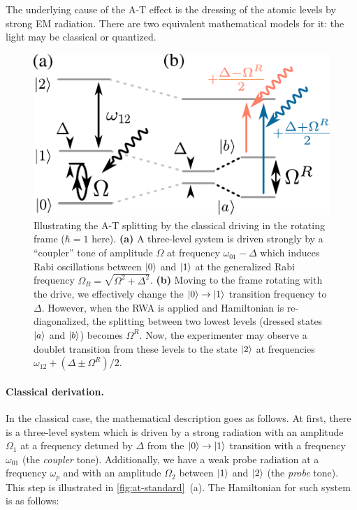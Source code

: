 \documentclass[%
 pra,
 amsmath,amssymb,
 reprint,%
]{revtex4-1}
\begin{document}
The underlying cause of the A-T effect is the dressing of the atomic levels by strong EM radiation. There are two equivalent mathematical models for it: the light may be classical or quantized.

\begin{figure}[b]	
	\includegraphics[width=\linewidth]{intro_scheme}
	\caption{Illustrating the A-T splitting by  the classical driving in the rotating frame ($\hbar=1$ here). \textbf{(a)} A three-level system is driven strongly by a ``coupler'' tone of amplitude $\Omega$ at frequency $\omega_{01}-\Delta$ which induces Rabi oscillations between $\ket{0}$ and $\ket{1}$ at the generalized Rabi frequency $\Omega_R = \sqrt{\Omega^2 + \Delta^2}$. \textbf{(b)} Moving to the frame rotating with the drive, we effectively change the $\ket{0}\rightarrow \ket{1}$ transition frequency to $\Delta$. However, when the RWA is applied and Hamiltonian is re-diagonalized, the splitting between two lowest levels (dressed states $\ket{a}$ and $\ket{b}$) becomes $\Omega^R$. Now, the experimenter may observe a doublet transition from these levels to the state $\ket{2}$ at frequencies $\omega_{12}+(\Delta \pm \Omega^R)/2$.} 
	\label{fig:at-standard}
\end{figure}

\paragraph{Classical derivation.} In the classical case, the mathematical description goes as follows. At first, there is a three-level system which is driven by a strong radiation with an amplitude $\Omega_1$ at a frequency detuned by $\Delta$ from the $\ket{0}\rightarrow \ket{1}$ transition with a frequency $\omega_{01}$ (the \textit{coupler} tone). Additionally, we have a weak probe radiation at a frequency $\omega_{p}$ and with an amplitude $\Omega_2$ between $\ket{1}$ and $\ket{2}$ (the \textit{probe} tone). This step is illustrated in \autoref{fig:at-standard}~(a). The Hamiltonian for such system is as follows:
\end{document}
